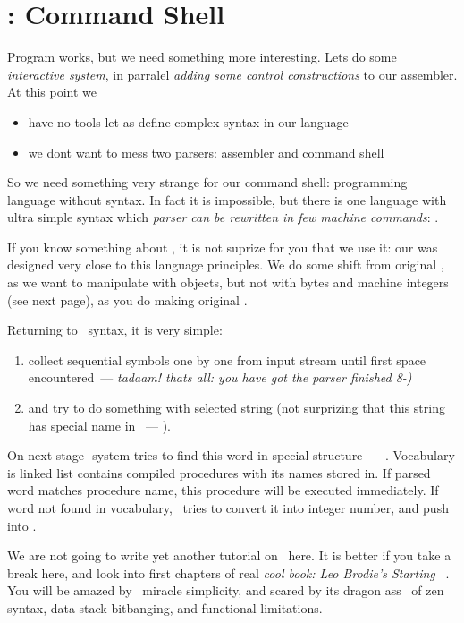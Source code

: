 \section{\F: Command Shell}\label{pyforth}

Program works, but we need something more interesting. Lets do some
\emph{interactive system}, in parralel \emph{adding some control constructions}
to our assembler. At this point we
\begin{itemize}
	\item have no tools let as define complex syntax in our language
	\item we dont want to mess two parsers: assembler and command shell
\end{itemize}
So we need something very strange for our command shell: programming language
without syntax. In fact it is impossible, but there is one language with ultra
simple syntax which \emph{parser can be rewritten in few machine commands}: \F.

If you know something about \F, it is not suprize for you that we use it: our
was designed very close to this language principles. We do some shift
from original \F, as we want to manipulate with objects, but not with bytes
and machine integers (see next page), as you do making original
.

\bigskip
Returning to \F\ syntax, it is very simple:
\begin{enumerate}[nosep]
\item collect sequential symbols one by one from input stream until first
space encountered\ --- \emph{tadaam! thats all: you have got the parser 
finished 8-)}
\item and try to do something with selected string (not surprizing that this 
string has special name in \F\ --- ).
\end{enumerate}
On next stage \F-system tries to find this word in special structure\ ---
. Vocabulary is linked list contains compiled procedures
with its names stored in.
If parsed word matches procedure name, this procedure will
be executed immediately. If word not found in vocabulary, \F\ tries to convert
it into integer number, and push into .

\bigskip
We are not going to write yet another tutorial on \F\ here. It is better
if you take a break here, and look into first chapters of real \emph{cool book:
Leo Brodie's Starting \F}\ \cite{starting}. You will be amazed by \F\ miracle
simplicity, and scared by its dragon ass \cite{dragon}\ of zen syntax,
data stack bitbanging, and functional limitations.

